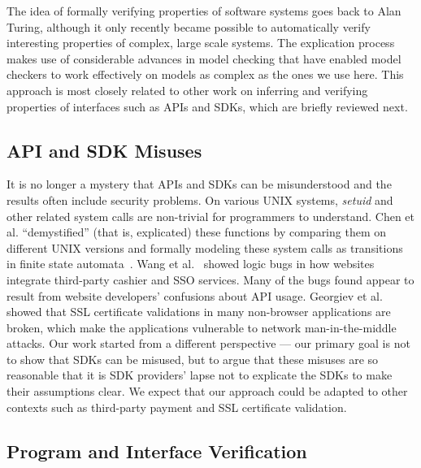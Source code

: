 The idea of formally verifying properties of software systems goes back to Alan Turing, although it only recently became possible to automatically verify interesting properties of complex, large scale systems.  The explication process makes use of considerable advances in model checking that have enabled model checkers to work effectively on models as complex as the ones we use here.  This approach is most closely related to other work on inferring and verifying properties of interfaces such as APIs and SDKs, which are briefly reviewed next.

\subsection{API and SDK Misuses}

It is no longer a mystery that APIs and SDKs can be misunderstood and the results often include security problems.  On various UNIX systems, \emph{setuid} and other related system calls are non-trivial for programmers to understand.  Chen et al. ``demystified'' (that is, explicated) these functions by comparing them on different UNIX versions and formally modeling these system calls as transitions in finite state automata~\cite{Chen:2002:SD:647253.720278}.  Wang et al.~\cite{Wang:2011:SFO:2006077.2006782,Wang:2012:SMY:2310656.2310691} showed logic bugs in how websites integrate third-party cashier and SSO services.  Many of the bugs found appear to result from website developers' confusions about API usage. Georgiev et al.~\cite{Georgiev:2012:MDC:2382196.2382204} showed that SSL certificate validations in many non-browser applications are broken, which make the applications vulnerable to network man-in-the-middle attacks.  Our work started from a different perspective --- our primary goal is not to show that SDKs can be misused, but to argue that these misuses are so reasonable that it is SDK providers' lapse not to explicate the SDKs to make their assumptions clear.  We expect that our approach could be adapted to other contexts such as third-party payment and SSL certificate validation. 

\subsection{Program and Interface Verification}

